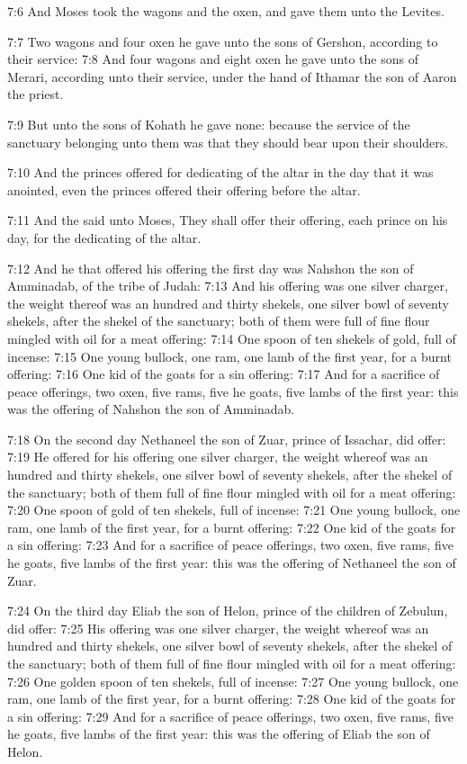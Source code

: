 7:6 And Moses took the wagons and the oxen, and gave them unto the Levites.

7:7 Two wagons and four oxen he gave unto the sons of Gershon, according to their service: 7:8 And four wagons and eight oxen he gave unto the sons of Merari, according unto their service, under the hand of Ithamar the son of Aaron the priest.

7:9 But unto the sons of Kohath he gave none: because the service of the sanctuary belonging unto them was that they should bear upon their shoulders.

7:10 And the princes offered for dedicating of the altar in the day that it was anointed, even the princes offered their offering before the altar.

7:11 And the \LORD said unto Moses, They shall offer their offering, each prince on his day, for the dedicating of the altar.

7:12 And he that offered his offering the first day was Nahshon the son of Amminadab, of the tribe of Judah: 7:13 And his offering was one silver charger, the weight thereof was an hundred and thirty shekels, one silver bowl of seventy shekels, after the shekel of the sanctuary; both of them were full of fine flour mingled with oil for a meat offering: 7:14 One spoon of ten shekels of gold, full of incense: 7:15 One young bullock, one ram, one lamb of the first year, for a burnt offering: 7:16 One kid of the goats for a sin offering: 7:17 And for a sacrifice of peace offerings, two oxen, five rams, five he goats, five lambs of the first year: this was the offering of Nahshon the son of Amminadab.

7:18 On the second day Nethaneel the son of Zuar, prince of Issachar, did offer: 7:19 He offered for his offering one silver charger, the weight whereof was an hundred and thirty shekels, one silver bowl of seventy shekels, after the shekel of the sanctuary; both of them full of fine flour mingled with oil for a meat offering: 7:20 One spoon of gold of ten shekels, full of incense: 7:21 One young bullock, one ram, one lamb of the first year, for a burnt offering: 7:22 One kid of the goats for a sin offering: 7:23 And for a sacrifice of peace offerings, two oxen, five rams, five he goats, five lambs of the first year: this was the offering of Nethaneel the son of Zuar.

7:24 On the third day Eliab the son of Helon, prince of the children of Zebulun, did offer: 7:25 His offering was one silver charger, the weight whereof was an hundred and thirty shekels, one silver bowl of seventy shekels, after the shekel of the sanctuary; both of them full of fine flour mingled with oil for a meat offering: 7:26 One golden spoon of ten shekels, full of incense: 7:27 One young bullock, one ram, one lamb of the first year, for a burnt offering: 7:28 One kid of the goats for a sin offering: 7:29 And for a sacrifice of peace offerings, two oxen, five rams, five he goats, five lambs of the first year: this was the offering of Eliab the son of Helon.

